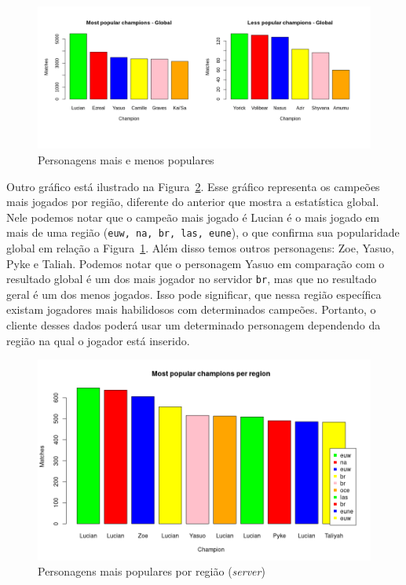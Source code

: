 \documentclass[a4paper]{article}
\begin{document}
\begin{figure}[ht]
\centering
\includegraphics[width=1\columnwidth]{imagens/less_most_popular}
\caption{\label{fig:popular}Personagens mais e menos populares}
\end{figure}

Outro gráfico está ilustrado na Figura~\ref{fig:popular2}. Esse gráfico representa os campeões mais jogados por região, diferente do anterior que mostra a estatística global. Nele podemos notar que o campeão mais jogado é Lucian é o mais jogado em mais de uma região (\texttt{euw, na, br, las, eune}), o que confirma sua popularidade global em relação a Figura~\ref{fig:popular}. Além disso temos outros personagens: Zoe, Yasuo, Pyke e Taliah. Podemos notar que o personagem Yasuo em comparação com o resultado global é um dos mais jogador no servidor \texttt{br}, mas que no resultado geral é um dos menos jogados. Isso pode significar, que nessa região específica existam jogadores mais habilidosos com determinados campeões. Portanto, o cliente desses dados poderá usar um determinado personagem dependendo da região na qual o jogador está inserido.

\begin{figure}[ht]
\centering
\includegraphics[width=0.7\columnwidth]{imagens/region}
\caption{\label{fig:popular2}Personagens mais populares por região (\textit{server})}
\end{figure}
\end{document}

